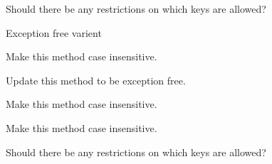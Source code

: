 \begin{DoxyRefList}
Should there be any restrictions on which keys are allowed? 

Exception free varient 
\item[\label{todo__todo000014}%
\hypertarget{todo__todo000014}{}%
Member \hyperlink{classwebsocketpp_1_1http_1_1parser_1_1parser_a6a2a10752449789e6a2af06972c53d94}{websocketpp\+:\+:http\+:\+:parser\+:\+:parser\+:\+:get\+\_\+header} (std\+::string const \&key) const ]Make this method case insensitive. 
\item[\label{todo__todo000018}%
\hypertarget{todo__todo000018}{}%
Member \hyperlink{classwebsocketpp_1_1http_1_1parser_1_1parser_a4dbb443fd916f8b4306e7afdb2e8ff45}{websocketpp\+:\+:http\+:\+:parser\+:\+:parser\+:\+:process\+\_\+header} (std\+::string\+::iterator begin, std\+::string\+::iterator end)]Update this method to be exception free. 
\item[\label{todo__todo000017}%
\hypertarget{todo__todo000017}{}%
Member \hyperlink{classwebsocketpp_1_1http_1_1parser_1_1parser_a64ff49a6a1ddbf70b9767874ffdd513e}{websocketpp\+:\+:http\+:\+:parser\+:\+:parser\+:\+:remove\+\_\+header} (std\+::string const \&key)]Make this method case insensitive. 
\item[\label{todo__todo000016}%
\hypertarget{todo__todo000016}{}%
Member \hyperlink{classwebsocketpp_1_1http_1_1parser_1_1parser_aba2991b2aa41ca60d9427950502b0b93}{websocketpp\+:\+:http\+:\+:parser\+:\+:parser\+:\+:replace\+\_\+header} (std\+::string const \&key, std\+::string const \&val)]Make this method case insensitive. 

Should there be any restrictions on which keys are allowed? 


\end{DoxyRefList}
